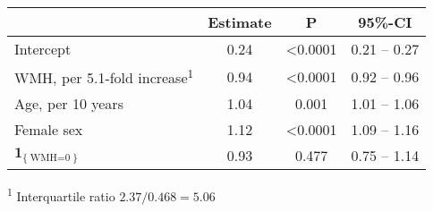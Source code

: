 \begin{table}
\centering
\setlength{\LTpost}{0mm}
\begin{longtable}{lccc}
\toprule
 & Estimate & P & 95\%-CI \\ 
\midrule
Intercept & 0.24 & <0.0001 & 0.21 -- 0.27 \\ 
WMH, per 5.1-fold increase\textsuperscript{1} & 0.94 & <0.0001 & 0.92 -- 0.96 \\ 
Age, per 10 years & 1.04 & 0.001 & 1.01 -- 1.06 \\ 
Female sex & 1.12 & <0.0001 & 1.09 -- 1.16 \\ 
$\mathbf{1}_{\{\operatorname{WMH=0}\}}$ & 0.93 & 0.477 & 0.75 -- 1.14 \\ 
\bottomrule
\end{longtable}
\addtocounter{table}{-1}
\textsuperscript{1} Interquartile ratio $2.37/0.468=5.06$
\label{tab:hyp1}
\end{table}
